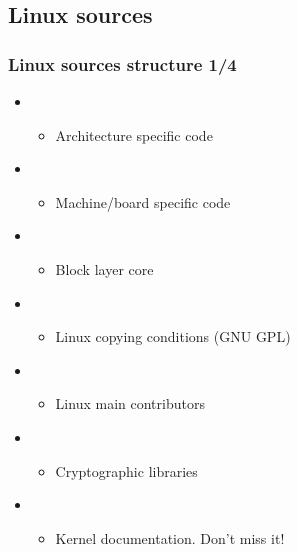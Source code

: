 \subsection{Linux sources}

\begin{frame}
  \frametitle{Linux sources structure 1/4}
  \begin{itemize}
  \item {}
    \begin{itemize}
    \item Architecture specific code
    \end{itemize}
  \item {}
    \begin{itemize}
    \item Machine/board specific code
    \end{itemize}
  \item {}
    \begin{itemize}
    \item Block layer core
    \end{itemize}
  \item {}
    \begin{itemize}
    \item Linux copying conditions (GNU GPL)
    \end{itemize}
  \item {}
    \begin{itemize}
    \item Linux main contributors
    \end{itemize}
  \item {}
    \begin{itemize}
    \item Cryptographic libraries
    \end{itemize}
  \item {}
    \begin{itemize}
    \item Kernel documentation. Don't miss it!
    \end{itemize}
  \end{itemize}
\end{frame}

